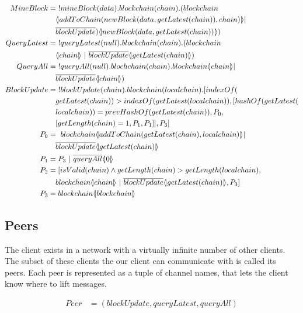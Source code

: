 \begin{align*}
    MineBlock &=\ !mineBlock(data).blockchain(chain).(blockchain\\
        &\quad \lift{}{addToChain(newBlock(data,getLatest(chain)),chain)}|\\
        &\quad \overline{blockUpdate})\lift{}{newBlock(data, getLatest(chain))})\\
    QueryLatest &=\ !queryLatest(null).blockchain(chain).(blockchain\\
        &\quad \lift{}{chain}\ |\ \overline{blockUpdate}\lift{}{getLatest(chain)})\\
        QueryAll &=\ !queryAll(null).blochchain(chain).blockchain\lift{}{chain}|\\
        &\quad \overline{blockUpdate}\lift{}{chain})\\
    BlockUpdate &=\ !blockUpdate(chain).blockchain(localchain).[indexOf(\\
        &\quad getLatest(chain))>indexOf(getLatest(localchain)),[hashOf(getLatest(\\
        &\quad localchain))=prevHashOf(getLatest(chain)),P_0,\\
        &\quad [getLength(chain)=1,P_1,P_1]],P_3]\\
    P_0 &=\ blockchain\lift{}{addToChain(getLatest(chain),localchain)}|\\
        &\quad \overline{blockUpdate}\lift{}{getLatest(chain)}\\
    P_1 &= P_3\ |\ \overline{queryAll}\lift{}{0}\\
    P_2 &= [isValid(chain) \land getLength(chain) > getLength(localchain),\\
        &\quad blockchain\lift{}{chain}\ |\ \overline{blockUpdate}\lift{}{getLatest(chain)},P_3]\\
    P_3 &= blockchain\lift{}{blockchain}
\end{align*}

\subsection{Peers}
The client exists in a network with a virtually infinite number of other clients.
The subset of these clients the our client can communicate with is called its peers.
Each peer is represented as a tuple of channel names, that lets the client know where to lift messages.

\begin{align*}
	Peer &= (blockUpdate, queryLatest, queryAll)
\end{align*}

